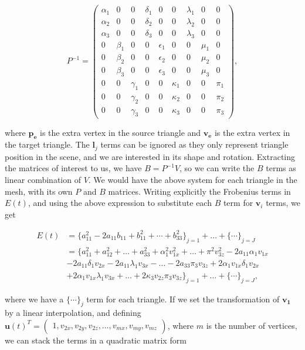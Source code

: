 \documentclass[12pt]{article}
\begin{document}
\begin{equation*}
P^{-1} = 
\begin{pmatrix}
\alpha_1 & 0 & 0 & \delta_1 & 0 & 0 & \lambda_1 & 0 & 0 \\
\alpha_2 & 0 & 0 & \delta_2 & 0 & 0 & \lambda_2 & 0 & 0 \\
\alpha_3 & 0 & 0 & \delta_3 & 0 & 0 & \lambda_3 & 0 & 0 \\
0 & \beta_1 & 0 & 0 & \epsilon_1 & 0 & 0 & \mu_1 & 0 \\
0 & \beta_2 & 0 & 0 & \epsilon_2 & 0 & 0 & \mu_2 & 0 \\
0 & \beta_3 & 0 & 0 & \epsilon_3 & 0 & 0 & \mu_3 & 0 \\
0 & 0 & \gamma_1 & 0 & 0 & \kappa_1 & 0 & 0 & \pi_1 \\
0 & 0 & \gamma_2 & 0 & 0 & \kappa_2 & 0 & 0 & \pi_2  \\
0 & 0 & \gamma_3 & 0 & 0 & \kappa_3 & 0 & 0 & \pi_3
\end{pmatrix},
\end{equation*}

where $\mathbf{p_e}$ is the extra vertex in the source triangle and $\mathbf{v_e}$ is the extra vertex in the target triangle.
The $\mathbf{l}_j$ terms can be ignored as they only represent triangle position in the scene, and we are interested in its shape and rotation.
Extracting the matrices of interest to us, we have $B = P^{-1}V$, so we can write the $B$ terms as linear combination of $V$.
We would have the above system for each triangle in the mesh, with its own $P$ and $B$ matrices.  
Writing explicitly the Frobenius terms in $E(t)$, and using the above expression to substitute each $B$ term for $\mathbf{v}_i$ terms, we get

\begin{align*}
E(t) &= \lbrace a_{11}^2 - 2 a_{11} b_{11} + b_{11}^2 + \cdots +  b_{33}^2 \rbrace_{j = 1} + \ldots + \lbrace \cdots \rbrace_{j = J} \\ 
& = \lbrace a_{11}^2 + a_{12}^2 + \ldots + a_{33}^2 + \alpha_1^2 v_{1x}^2 + \ldots + \pi^2 v_{3z}^2 - 2 a_{11} \alpha_1 v_{1x} \\
& - 2 a_{11} \delta_1 v_{2x} - 2 a_{11} \lambda_1 v_{3x} - \ldots - 2 a_{33} \pi_3 v_{3z} + 2 \alpha_1 v_{1x} \delta_1 v_{2x} \\ 
& + 2 \alpha_1 v_{1x} \lambda_1 v_{3x} + \ldots + 2 \kappa_3 v_{2z} \pi_3 v_{3z} \rbrace_{j = 1} + \ldots + \lbrace \cdots \rbrace_{j = J},
\end{align*}

where we have a $\lbrace \cdots \rbrace_j$ term for each triangle.
If we set the transformation of $\mathbf{v_1}$ by a linear interpolation, and defining 
$\mathbf{u}(t)^T = \begin{pmatrix} 1, v_{2x}, v_{2y}, v_{2z}, \ldots, v_{mx}, v_{my}, v_{mz} \end{pmatrix}$, where $m$ is the number of vertices, we can stack the terms in a quadratic matrix form 
\end{document}
